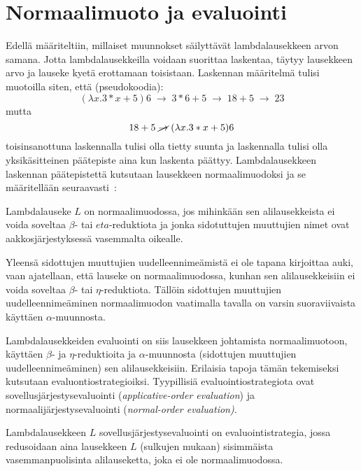 \section{Normaalimuoto ja evaluointi}

Edellä määriteltiin, millaiset muunnokset säilyttävät lambdalausekkeen arvon samana. Jotta lambdalausekkeilla voidaan suorittaa laskentaa, täytyy lausekkeen arvo ja lauseke kyetä erottamaan toisistaan. Laskennan määritelmä tulisi muotoilla siten, että (pseudokoodia):
\[ 
(\lambda x. 3 * x + 5) 6 \; \rightarrow \; 3 * 6 + 5 \; \rightarrow \; 18 + 5 \; \rightarrow \; 23 
\]
mutta 
\[ 18 + 5 \; \cancel{\rightarrow} \; (\lambda x. 3 * x + 5) 6 \]
toisinsanottuna laskennalla tulisi olla tietty suunta ja laskennalla tulisi olla yksikäsitteinen päätepiste aina kun laskenta päättyy. Lambdalausekkeen laskennan päätepistettä kutsutaan lausekkeen normaalimuodoksi ja se määritellään seuraavasti~\cite[s.~9]{Hudak89}: 

\begin{maar}[normaalimuoto]
Lambdalauseke $L$ on normaalimuodossa, jos mihinkään sen alilausekkeista ei voida soveltaa $\beta$- tai $eta$-reduktiota ja jonka sidotuttujen muuttujien nimet ovat aakkosjärjestyksessä vasemmalta oikealle.  
\end{maar}

Yleensä sidottujen muuttujien uudelleennimeämistä ei ole tapana kirjoittaa auki, vaan ajatellaan, että lauseke on normaalimuodossa, kunhan sen alilausekkeisiin ei voida soveltaa $\beta$- tai $\eta$-reduktiota. Tällöin sidottujen muuttujien uudelleennimeäminen normaalimuodon vaatimalla tavalla on varsin suoraviivaista käyttäen $\alpha$-muunnosta.
\par
Lambdalausekkeiden evaluointi on siis lausekkeen johtamista normaalimuotoon, käyttäen $\beta$- ja $\eta$-reduktioita ja $\alpha$-muunnosta (sidottujen muuttujien uudelleennimeäminen) sen alilausekkeisiin. Erilaisia tapoja tämän tekemiseksi kutsutaan evaluontiostrategioiksi. Tyypillisiä evaluointiostrategiota ovat sovellusjärjestysevaluointi (\textit{applicative-order evaluation}) ja normaalijärjestysevaluointi (\textit{normal-order evaluation)}.

\begin{alg}[sovellusjärjestysevaluointi] 
Lambdalausekkeen $L$ sovellusjärjestysevaluointi on evaluointistrategia, jossa redusoidaan aina lausekkeen $L$ (sulkujen mukaan) sisimmäista vasemmanpuolisinta alilauseketta, joka ei ole normaalimuodossa.
\end{alg}

